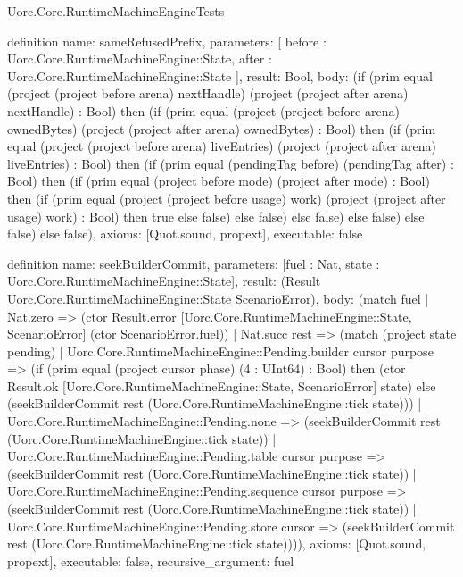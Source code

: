 \begin{lexlean}{Uorc.Core.RuntimeMachineEngineTests}
\begin{semanticmodule}
definition{
  name: sameRefusedPrefix,
  parameters: [
    before : Uorc.Core.RuntimeMachineEngine::State,
    after : Uorc.Core.RuntimeMachineEngine::State
  ],
  result: Bool,
  body: (if (prim equal (project (project before arena) nextHandle) (project (project after arena) nextHandle) : Bool) then (if (prim equal (project (project before arena) ownedBytes) (project (project after arena) ownedBytes) : Bool) then (if (prim equal (project (project before arena) liveEntries) (project (project after arena) liveEntries) : Bool) then (if (prim equal (pendingTag before) (pendingTag after) : Bool) then (if (prim equal (project before mode) (project after mode) : Bool) then (if (prim equal (project (project before usage) work) (project (project after usage) work) : Bool) then true else false) else false) else false) else false) else false) else false),
  axioms: [Quot.sound, propext],
  executable: false
}

definition{
  name: seekBuilderCommit,
  parameters: [fuel : Nat, state : Uorc.Core.RuntimeMachineEngine::State],
  result: (Result Uorc.Core.RuntimeMachineEngine::State ScenarioError),
  body: (match fuel
    | Nat.zero => (ctor Result.error [Uorc.Core.RuntimeMachineEngine::State, ScenarioError] (ctor ScenarioError.fuel))
    | Nat.succ rest => (match (project state pending)
      | Uorc.Core.RuntimeMachineEngine::Pending.builder cursor purpose => (if (prim equal (project cursor phase) (4 : UInt64) : Bool) then (ctor Result.ok [Uorc.Core.RuntimeMachineEngine::State, ScenarioError] state) else (seekBuilderCommit rest (Uorc.Core.RuntimeMachineEngine::tick state)))
      | Uorc.Core.RuntimeMachineEngine::Pending.none => (seekBuilderCommit rest (Uorc.Core.RuntimeMachineEngine::tick state))
      | Uorc.Core.RuntimeMachineEngine::Pending.table cursor purpose => (seekBuilderCommit rest (Uorc.Core.RuntimeMachineEngine::tick state))
      | Uorc.Core.RuntimeMachineEngine::Pending.sequence cursor purpose => (seekBuilderCommit rest (Uorc.Core.RuntimeMachineEngine::tick state))
      | Uorc.Core.RuntimeMachineEngine::Pending.store cursor => (seekBuilderCommit rest (Uorc.Core.RuntimeMachineEngine::tick state)))),
  axioms: [Quot.sound, propext],
  executable: false,
  recursive_argument: fuel
}


\end{semanticmodule}
\end{lexlean}
